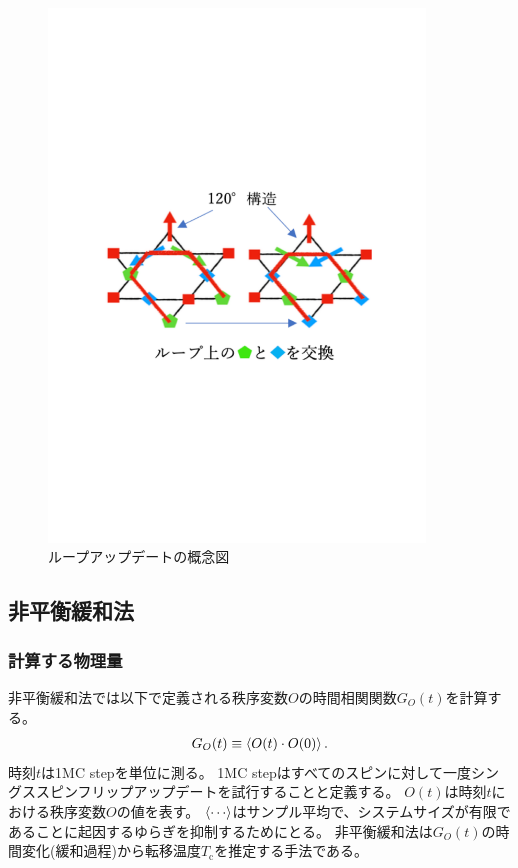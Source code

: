 \documentclass[12pt,titlepage,dvipdfmx]{jarticle}
\begin{document}
\begin{figure}[H]
   \centering
   \includegraphics[width=10cm]{figure/loop_update.pdf}
   \caption{ループアップデートの概念図}
\end{figure}

\newpage

\subsection{非平衡緩和法}

\subsubsection{計算する物理量}
非平衡緩和法では以下で定義される秩序変数$O$の時間相関関数$G_O(t)$を計算する。
\begin{align}
   G_{O}(t) \equiv \ev{O(t) \cdot O(0)}.
\end{align}
時刻$t$は1MC stepを単位に測る。
1MC stepはすべてのスピンに対して一度シングススピンフリップアップデートを試行することと定義する。
$O(t)$は時刻$t$における秩序変数$O$の値を表す。
$\ev{\cdots}$はサンプル平均で、システムサイズが有限であることに起因するゆらぎを抑制するためにとる。
非平衡緩和法は$G_O(t)$の時間変化(緩和過程)から転移温度$T_{\mathrm{c}}$を推定する手法である。
\end{document}
